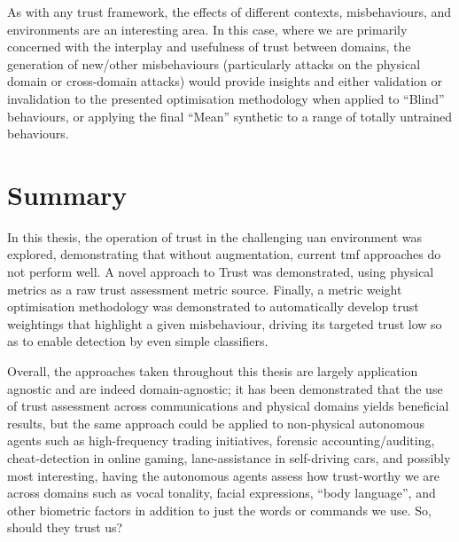 As with any trust framework, the effects of different contexts, misbehaviours, and environments are an interesting area.
In this case, where we are primarily concerned with the interplay and usefulness of trust between domains, the generation of new/other misbehaviours (particularly attacks on the physical domain or cross-domain attacks) would provide insights and either validation or invalidation to the presented optimisation methodology when applied to ``Blind'' behaviours, or applying the final ``Mean'' synthetic to a range of totally untrained behaviours.

\section{Summary}

In this thesis, the operation of trust in the challenging \gls{uan} environment was explored, demonstrating that without augmentation, current \gls{tmf} approaches do not perform well.
A novel approach to Trust was demonstrated, using physical metrics as a raw trust assessment metric source.
Finally, a metric weight optimisation methodology was demonstrated to automatically develop trust weightings that highlight a given misbehaviour, driving its targeted trust low so as to enable detection by even simple classifiers.

Overall, the approaches taken throughout this thesis are largely application agnostic and are indeed domain-agnostic; it has been demonstrated that the use of trust assessment across communications and physical domains yields beneficial results, but the same approach could be applied to non-physical autonomous agents such as high-frequency trading initiatives, forensic accounting/auditing,  cheat-detection in online gaming, lane-assistance in self-driving cars, and possibly most interesting, having the autonomous agents assess how trust-worthy we are across domains such as vocal tonality, facial expressions, ``body language'', and other biometric factors in addition to just the words or commands we use.
So, should they trust us?